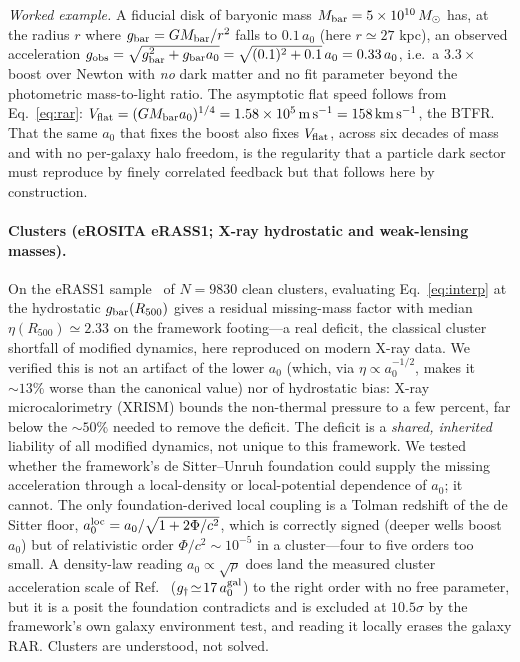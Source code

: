 \documentclass[aps,prd,twocolumn,10pt,nofootinbib,superscriptaddress]{revtex4-2}
\begin{document}
\emph{Worked example.} A fiducial disk of baryonic mass $M_{\rm bar}=5\times10^{10}\,M_\odot$ has, at the radius
$r$ where $g_{\rm bar}=GM_{\rm bar}/r^2$ falls to $0.1\,a_0$ (here $r\simeq27$ kpc), an observed acceleration
$g_{\rm obs}=\sqrt{g_{\rm bar}^2+g_{\rm bar}a_0}=\sqrt{(0.1)^2+0.1}\,a_0=0.33\,a_0$, i.e.\ a $3.3\times$ boost over
Newton with \emph{no} dark matter and no fit parameter beyond the photometric mass-to-light ratio. The asymptotic
flat speed follows from Eq.~\eqref{eq:rar}: $V_{\rm flat}=(GM_{\rm bar}a_0)^{1/4}=1.58\times10^5\,\mathrm{m\,s^{-1}}
=158\,\mathrm{km\,s^{-1}}$, the BTFR. That the same $a_0$ that fixes the boost also fixes $V_{\rm flat}$, across six
decades of mass and with no per-galaxy halo freedom, is the regularity that a particle dark sector must reproduce by
finely correlated feedback but that follows here by construction.

\paragraph{Clusters (eROSITA eRASS1; X-ray hydrostatic and weak-lensing masses).}
\label{sec:clusters}
On the eRASS1 sample~\cite{Bulbul2024} of $N\!=\!9830$ clean clusters, evaluating Eq.~\eqref{eq:interp} at the
hydrostatic $g_{\rm bar}(R_{500})$ gives a residual missing-mass factor with median $\eta(R_{500})\!\simeq\!2.33$ on
the framework footing---a real deficit, the classical cluster shortfall of modified dynamics, here reproduced on
modern X-ray data. We verified this is not an artifact of the lower $a_0$ (which, via $\eta\!\propto\!a_0^{-1/2}$,
makes it $\sim13\%$ worse than the canonical value) nor of hydrostatic bias: X-ray microcalorimetry (XRISM) bounds
the non-thermal pressure to a few percent, far below the $\sim50\%$ needed to remove the deficit. The deficit is a
\emph{shared, inherited} liability of all modified dynamics, not unique to this framework. We tested whether the
framework's de Sitter--Unruh foundation could supply the missing acceleration through a local-density or
local-potential dependence of $a_0$; it cannot. The only foundation-derived local coupling is a Tolman redshift of
the de Sitter floor, $a_0^{\rm loc}=a_0/\sqrt{1+2\Phi/c^2}$, which is correctly signed (deeper wells boost $a_0$) but
of relativistic order $\Phi/c^2\!\sim\!10^{-5}$ in a cluster---four to five orders too small. A density-law reading
$a_0\!\propto\!\sqrt{\rho}$ does land the measured cluster acceleration scale of Ref.~\cite{Tian2020}
($g_\dagger\!\simeq\!17\,a_0^{\rm gal}$) to the right order with no free parameter, but it is a posit the foundation
contradicts and is excluded at $10.5\sigma$ by the framework's own galaxy environment test, and reading it locally
erases the galaxy RAR. Clusters are understood, not solved.
\end{document}

